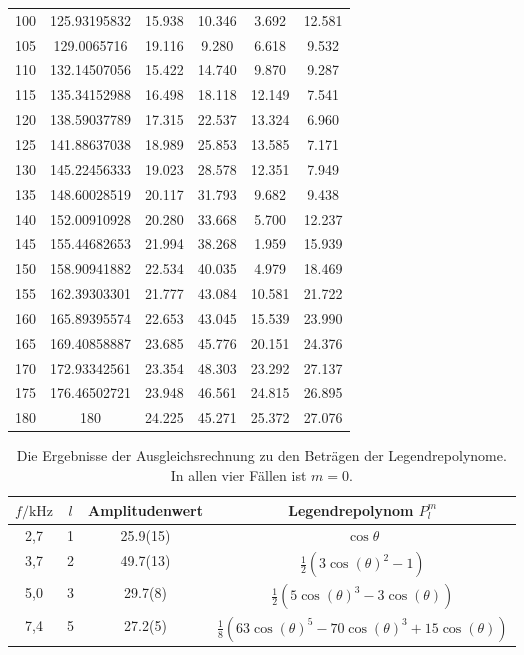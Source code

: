 \begin{table}
\begin{tabular}{S[round-precision=1] S[round-precision=1] S[] S[] S[] S[]}
100 & 125.93195832 & 15.938 & 10.346 & 3.692  & 12.581 \\
105 & 129.0065716 & 19.116 & 9.280  & 6.618  & 9.532 \\
110 & 132.14507056 & 15.422 & 14.740 & 9.870  & 9.287 \\
115 & 135.34152988 & 16.498 & 18.118 & 12.149 & 7.541 \\
120 & 138.59037789 & 17.315 & 22.537 & 13.324 & 6.960 \\
125 & 141.88637038 & 18.989 & 25.853 & 13.585 & 7.171 \\
130 & 145.22456333 & 19.023 & 28.578 & 12.351 & 7.949 \\
135 & 148.60028519 & 20.117 & 31.793 & 9.682  & 9.438 \\
140 & 152.00910928 & 20.280 & 33.668 & 5.700  & 12.237 \\
145 & 155.44682653 & 21.994 & 38.268 & 1.959  & 15.939 \\
150 & 158.90941882 & 22.534 & 40.035 & 4.979  & 18.469 \\
155 & 162.39303301 & 21.777 & 43.084 & 10.581 & 21.722 \\
160 & 165.89395574 & 22.653 & 43.045 & 15.539 & 23.990 \\
165 & 169.40858887 & 23.685 & 45.776 & 20.151 & 24.376 \\
170 & 172.93342561 & 23.354 & 48.303 & 23.292 & 27.137 \\
175 & 176.46502721 & 23.948 & 46.561 & 24.815 & 26.895 \\
180 & 180 & 24.225 & 45.271 & 25.372 & 27.076 \\

\bottomrule
\end{tabular}\end{table}



\begin{table}\caption{Die Ergebnisse der Ausgleichsrechnung zu den Beträgen der Legendrepolynome. In allen vier Fällen ist $m = 0$.}
    \label{tab:fit}
    \centering
     \begin{tabular}{c c S[round-precision=1] c} 
    \toprule
{$f / \si{\kilo\hertz}$} & {$l$} & {Amplitudenwert} & Legendrepolynom $P_l^m$ \\
,7     &   1   &  25.9(15)  &   $\cos \theta$   \\
3,7     &   2   &  49.7(13) &   $\frac{1}{2}(3 \cos(\theta)^2 -1)$ \\
5,0     &   3   &  29.7(8) &   $\frac{1}{2} (5  \cos(\theta)^3 -3 \cos(\theta))$  \\ 
7,4     &   5   &  27.2(5) &   $\frac{1}{8} (63  \cos(\theta)^5 -70 \cos(\theta)^3 + 15\cos(\theta))$  \\

\bottomrule
\end{tabular}\end{table}

